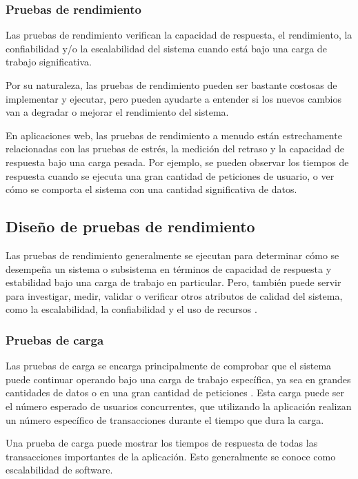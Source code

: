 \subsubsection{Pruebas de rendimiento}

Las pruebas de rendimiento verifican la capacidad de respuesta, el rendimiento, la confiabilidad y/o la escalabilidad del sistema cuando está bajo una carga de trabajo significativa.

Por su naturaleza, las pruebas de rendimiento pueden ser bastante costosas de implementar y ejecutar, pero pueden ayudarte a entender si los nuevos cambios van a degradar o mejorar el rendimiento del sistema.

En aplicaciones web, las pruebas de rendimiento a menudo están estrechamente relacionadas con las pruebas de estrés, la medición del retraso y la capacidad de respuesta bajo una carga pesada. Por ejemplo, se pueden observar los tiempos de respuesta cuando se ejecuta una gran cantidad de peticiones de usuario, o ver cómo se comporta el sistema con una cantidad significativa de datos.

\subsection{Diseño de pruebas de rendimiento}

Las pruebas de rendimiento generalmente se ejecutan para determinar cómo se desempeña un sistema o subsistema en términos de capacidad de respuesta y estabilidad bajo una carga de trabajo en particular. Pero, también puede servir para investigar, medir, validar o verificar otros atributos de calidad del sistema, como la escalabilidad, la confiabilidad y el uso de recursos \cite{jmeter6}.

\subsubsection{Pruebas de carga}

Las pruebas de carga se encarga principalmente de comprobar que el sistema puede continuar operando bajo una carga de trabajo específica, ya sea en grandes cantidades de datos o en una gran cantidad de peticiones \cite{test4}. Esta carga puede ser el número esperado de usuarios concurrentes, que utilizando la aplicación realizan un número específico de transacciones durante el tiempo que dura la carga.

Una prueba de carga puede mostrar los tiempos de respuesta de todas las transacciones importantes de la aplicación. Esto generalmente se conoce como escalabilidad de software.

